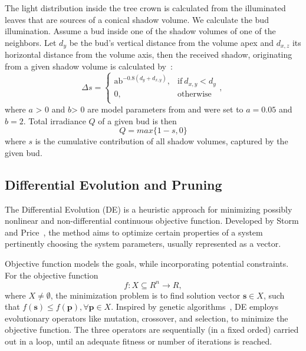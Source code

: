 The light distribution
inside the tree crown is calculated from the illuminated leaves that are
sources of a conical shadow volume. We calculate the bud illumination.
Assume a bud inside one of the shadow volumes of one of the
neighbors. Let \(d_{y}\) be the bud's vertical distance from the volume
apex and \(d_{x,z}\) its horizontal distance from the volume axis, then
the received shadow, originating from a given shadow volume is
calculated by~\cite{strnad_novel_2017}:
\begin{equation}
\Delta s = \left\{ \begin{matrix}
\text{ab}^{- 0.8\left( d_{y} + d_{x,y} \right)}, & \mathrm{\text{if}}\ d_{x,y} < d_{y} \\
0, & \mathrm{otherwise} \\
\end{matrix}, \right.\    
\end{equation}
where \(a\) \textgreater{} 0 and \(b\)\textgreater{} 0 are model
parameters from \cite{palubicki_self-organizing_2009} and were set to \(a = 0.05\) and \(b = 2\).
Total irradiance $Q$ of a given bud is then
\begin{equation}
  Q = max\{1 - s, 0\}\label{eqn:q}  
\end{equation}
where \(s\) is the cumulative contribution of all shadow volumes,
captured by the given bud.

\subsection{Differential Evolution and Pruning}
The Differential Evolution (DE) is a heuristic approach for minimizing possibly nonlinear and non-differential continuous objective function. Developed by Storm and Price~\cite{storn_differential_1997}, the method aims to optimize certain properties of a system pertinently choosing the system parameters, usually represented as a vector. 

Objective function models the goals, while incorporating potential constraints. For the objective function 
\begin{equation}
f:X \subseteq\!R^{n}\rightarrow \!R,
\end{equation}
where $X\neq\emptyset$, the minimization problem is to find solution vector $\mathbf{s}\in X$, such that $f(\mathbf{s})\leq f(\mathbf{p}), \forall \mathbf{p}\in X$. 
Inspired by genetic algorithms~\cite{davis1991handbook}, DE employs evolutionary operators like mutation, crossover, and selection, to minimize the objective function. The three operators are sequentially (in a fixed orded) carried out in a loop, until an adequate fitness or number of iterations is reached.

